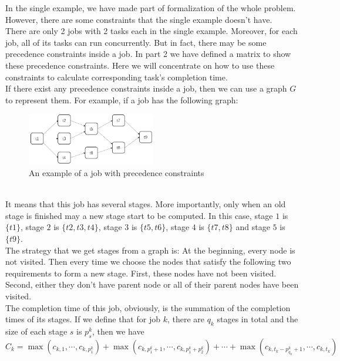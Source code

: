 \documentclass{llncs}
\begin{document}
In the single example, we have made part of formalization of the whole problem. However, there are some constraints that the single example doesn't have.\\
There are only 2 jobs with 2 tasks each in the single example. Moreover, for each job, all of its tasks can run concurrently. But in fact, there may be some precedence constraints inside a job. In part 2 we have defined a matrix to show these precedence constraints. Here we will concentrate on how to use these constraints to calculate corresponding task's completion time.\\
If there exist any precedence constraints inside a job, then we can use a graph $G$ to represent them. For example, if a job has the following graph:
\begin{figure}[h]
    \centering
    \includegraphics[width=0.5\textwidth]{img/samplegraph.png}
    \caption{An example of a job with precedence constraints}
    \label{fig:azure}
\end{figure}\\
It means that this job has several stages. More importantly, only when an old stage is finished may a new stage start to be computed. In this case, stage $1$ is $\{t1\}$, stage $2$ is $\{t2,t3,t4\}$, stage $3$ is $\{t5,t6\}$, stage $4$ is $\{t7,t8\}$ and stage $5$ is $\{t9\}$.\\
The strategy that we get stages from a graph is: At the beginning, every node is not visited. Then every time we choose the nodes that satisfy the following two requirements to form a new stage. First, these nodes have not been visited. Second, either they don't have parent node or all of their parent nodes have been visited.\\
The completion time of this job, obviously, is the summation of the completion times of its stages. If we define that for job $k$, there are $q_k$ stages in total and the size of each stage $s$ is $p_s^k$, then we have 
\begin{equation}\label{eq:stage}
    C_k=\max(c_{k,1},\cdots,c_{k,p_1^k})+\max(c_{k,p_1^k+1},\cdots,c_{k,p_1^k+p_2^k})+\cdots+\max(c_{k,t_k-p_{q_k}^k+1},\cdots,c_{k,t_k})
\end{equation}
\end{document}

